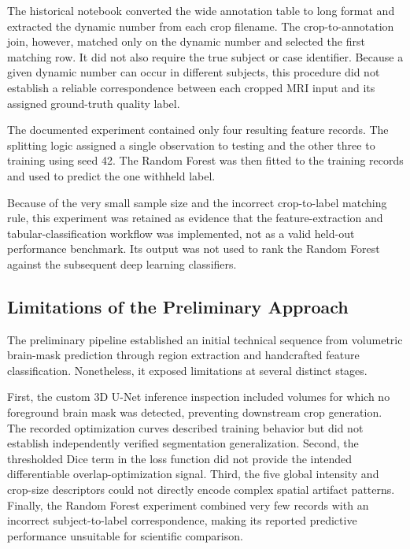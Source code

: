 The historical notebook converted the wide annotation table to long format and extracted the dynamic number from each crop filename. The crop-to-annotation join, however, matched only on the dynamic number and selected the first matching row. It did not also require the true subject or case identifier. Because a given dynamic number can occur in different subjects, this procedure did not establish a reliable correspondence between each cropped MRI input and its assigned ground-truth quality label.

The documented experiment contained only four resulting feature records. The splitting logic assigned a single observation to testing and the other three to training using seed 42. The Random Forest was then fitted to the training records and used to predict the one withheld label.

Because of the very small sample size and the incorrect crop-to-label matching rule, this experiment was retained as evidence that the feature-extraction and tabular-classification workflow was implemented, not as a valid held-out performance benchmark. Its output was not used to rank the Random Forest against the subsequent deep learning classifiers.

\subsection{Limitations of the Preliminary Approach}
\label{subsec:preliminary_3d_limitations}

The preliminary pipeline established an initial technical sequence from volumetric brain-mask prediction through region extraction and handcrafted feature classification. Nonetheless, it exposed limitations at several distinct stages.

First, the custom 3D U-Net inference inspection included volumes for which no foreground brain mask was detected, preventing downstream crop generation. The recorded optimization curves described training behavior but did not establish independently verified segmentation generalization. Second, the thresholded Dice term in the loss function did not provide the intended differentiable overlap-optimization signal. Third, the five global intensity and crop-size descriptors could not directly encode complex spatial artifact patterns. Finally, the Random Forest experiment combined very few records with an incorrect subject-to-label correspondence, making its reported predictive performance unsuitable for scientific comparison.

